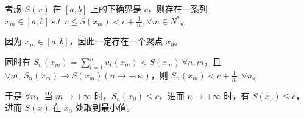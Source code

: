 考虑 $\displaystyle S( x)$ 在 $\displaystyle [ a,b]$ 上的下确界是 $\displaystyle c$，则存在一系列 $\displaystyle x_{m} \in [ a,b] \ s.t.\ c\leqslant S( x_{m}) < c+\frac{1}{m} ,\forall m\in N^{*}$。

因为 $\displaystyle x_{m} \in [ a,b]$，因此一定存在一个聚点 $\displaystyle x_{0}$。

同时有 $\displaystyle S_{n}( x_{m}) =\sum _{t=1}^{n} u_{t}( x_{m}) < S( x_{m}) \ \forall n,m$，且 $\displaystyle \forall m,\ S_{n}( x_{m})\rightarrow S( x_{m})\left( n\rightarrow +\infty \right)$，则 $\displaystyle S_{n}( x_{m}) < c+\frac{1}{m} ,\forall n$。

于是 $\displaystyle \forall n$，当 $\displaystyle m\rightarrow +\infty $ 时，$\displaystyle S_{n}( x_{0}) \leqslant c$，进而 $\displaystyle n\rightarrow +\infty $ 时，有 $\displaystyle S( x_{0}) \leqslant c$，进而 $\displaystyle S( x)$ 在 $\displaystyle x_{0}$ 处取到最小值。


\ifx\allfiles\undefined

\fi